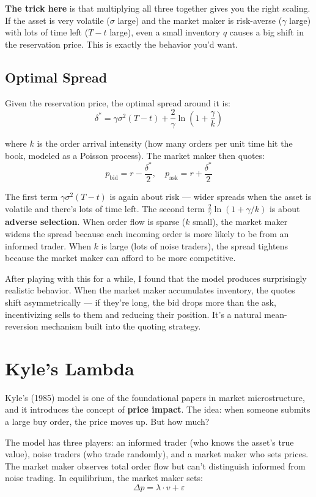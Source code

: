 \documentclass[11pt]{article}
\begin{document}
\textbf{The trick here} is that multiplying all three together gives you the right scaling. If the asset is very volatile ($\sigma$ large) and the market maker is risk-averse ($\gamma$ large) with lots of time left ($T - t$ large), even a small inventory $q$ causes a big shift in the reservation price. This is exactly the behavior you'd want.

\subsection{Optimal Spread}

Given the reservation price, the optimal spread around it is:
\[
    \delta^* = \gamma \sigma^2 (T - t) + \frac{2}{\gamma} \ln\left(1 + \frac{\gamma}{k}\right)
\]

where $k$ is the order arrival intensity (how many orders per unit time hit the book, modeled as a Poisson process). The market maker then quotes:
\[
    p_{\text{bid}} = r - \frac{\delta^*}{2}, \quad p_{\text{ask}} = r + \frac{\delta^*}{2}
\]

The first term $\gamma \sigma^2(T-t)$ is again about risk --- wider spreads when the asset is volatile and there's lots of time left. The second term $\frac{2}{\gamma}\ln(1 + \gamma/k)$ is about \textbf{adverse selection}. When order flow is sparse ($k$ small), the market maker widens the spread because each incoming order is more likely to be from an informed trader. When $k$ is large (lots of noise traders), the spread tightens because the market maker can afford to be more competitive.

After playing with this for a while, I found that the model produces surprisingly realistic behavior. When the market maker accumulates inventory, the quotes shift asymmetrically --- if they're long, the bid drops more than the ask, incentivizing sells to them and reducing their position. It's a natural mean-reversion mechanism built into the quoting strategy.

\section{Kyle's Lambda}

Kyle's (1985) model is one of the foundational papers in market microstructure, and it introduces the concept of \textbf{price impact}. The idea: when someone submits a large buy order, the price moves up. But how much?

The model has three players: an informed trader (who knows the asset's true value), noise traders (who trade randomly), and a market maker who sets prices. The market maker observes total order flow but can't distinguish informed from noise trading. In equilibrium, the market maker sets:
\[
    \Delta p = \lambda \cdot v + \varepsilon
\]
\end{document}
